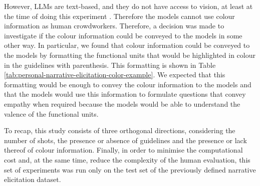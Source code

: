
However, LLMs are text-based, and they do not have access to vision, at least at the time of doing this experiment \cite{chatgpt-see}. Therefore the models cannot use colour information as human crowdworkers. Therefore, a decision was made to investigate if the colour information could be conveyed to the models in some other way. In particular, we found that colour information could be conveyed to the models by formatting the functional units that would be highlighted in colour in the guidelines with parenthesis. This formatting is shown in Table \ref{tab:personal-narrative-elicitation-color-example}. We expected that this formatting would be enough to convey the colour information to the models and that the models would use this information to formulate questions that convey empathy when required because the models would be able to understand the valence of the functional units. 

% 
To recap, this study consists of three orthogonal directions, considering the number of shots, the presence or absence of guidelines and the presence or lack thereof of colour information. 
Finally, in order to minimise the computational cost and, at the same time, reduce the complexity of the human evaluation, this set of experiments was run only on the test set of the previously defined narrative elicitation dataset. 
